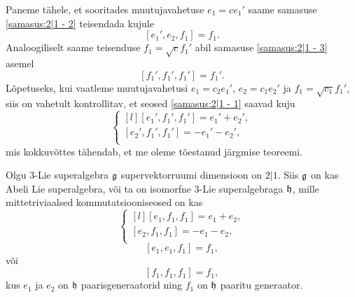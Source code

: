 Paneme tähele, et sooritades muutujavahetuse $e_1 = c e_1'$ saame samasuse
\eqref{samasus:2|1 - 2} teisendada kujule
\[ [e_1', e_2, f_1] = f_1. \]
Analoogiliselt saame teisenduse $f_1 = \sqrt{c} f_1'$ abil samasuse
\eqref{samasus:2|1 - 3} asemel
\[ [f_1', f_1', f_1'] = f_1'. \]
Lõpetuseks, kui vaatleme muutujavahetusi $e_1 = c_2 e_1'$, $e_2 = c_1 e_2'$
ja $f_1 = \sqrt{c_1} f_1'$, siis on vahetult kontrollitav, et seosed
\eqref{samasus:2|1 - 1} saavad kuju
\[ \left\{
    \begin{matrix*}[l]
        [e_1', f_1', f_1'] = e_1' + e_2', \\
        [e_2', f_1', f_1'] = -e_1' - e_2', \\
    \end{matrix*}
\right. \]
mis kokkuvõttes tähendab, et me oleme tõestanud järgmise teoreemi.

\begin{thm}
    Olgu $3$-Lie superalgebra $\mathfrak{g}$ supervektorruumi dimensioon on $2|1$.
    Siis $\mathfrak{g}$ on kas Abeli Lie superalgebra, või ta on isomorfne $3$-Lie
    superalgebraga $\mathfrak{h}$, mille mittetriviaalsed kommutatsiooniseosed on kas
    \[ \left\{
        \begin{matrix*}[l]
            [e_1, f_1, f_1] = e_1 + e_2, \\
            [e_2, f_1, f_1] = -e_1 - e_2, \\
        \end{matrix*}
    \right. \]
    \[ [e_1, e_1, f_1] = f_1, \]
    või
    \[ [f_1, f_1, f_1] = f_1, \]
    kus $e_1$ ja $e_2$ on $\mathfrak{h}$ paarisgeneraatorid ning $f_1$ on $\mathfrak{h}$ paaritu
    generaator.
\end{thm}

